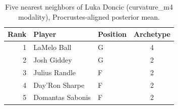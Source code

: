 \begin{table}[htbp]
  \centering\small
  \begin{tabular}{rllc}
    \toprule
    Rank & Player & Position & Archetype \\
    \midrule
    1 & LaMelo Ball & G & 4 \\
    2 & Josh Giddey & G & 2 \\
    3 & Julius Randle & F & 2 \\
    4 & Day'Ron Sharpe & F & 2 \\
    5 & Domantas Sabonis & F & 2 \\
    \bottomrule
  \end{tabular}
  \caption{Five nearest neighbors of Luka Doncic (curvature_m4 modality), Procrustes-aligned posterior mean.}
  \label{tab:Luka_Doncic_neighbors_curvature_m4}
\end{table}

